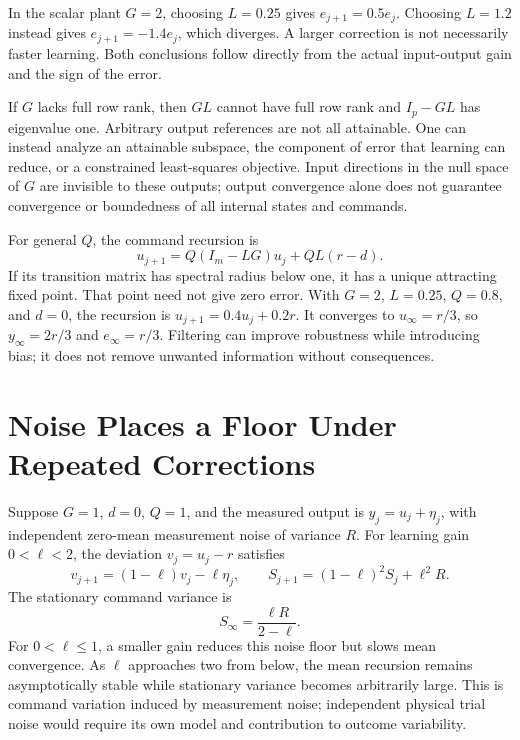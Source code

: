 \documentclass[12pt, openany]{book}
\theoremstyle{plain}
\begin{document}
In the scalar plant $G=2$, choosing $L=0.25$ gives $e_{j+1}=0.5e_j$. Choosing $L=1.2$ instead gives $e_{j+1}=-1.4e_j$, which diverges. A larger correction is not necessarily faster learning. Both conclusions follow directly from the actual input-output gain and the sign of the error.

If $G$ lacks full row rank, then $GL$ cannot have full row rank and $I_p-GL$ has eigenvalue one. Arbitrary output references are not all attainable. One can instead analyze an attainable subspace, the component of error that learning can reduce, or a constrained least-squares objective. Input directions in the null space of $G$ are invisible to these outputs; output convergence alone does not guarantee convergence or boundedness of all internal states and commands.

For general $Q$, the command recursion is
\begin{equation}
u_{j+1}=Q(I_m-LG)u_j+QL(r-d).
\end{equation}
If its transition matrix has spectral radius below one, it has a unique attracting fixed point. That point need not give zero error. With $G=2$, $L=0.25$, $Q=0.8$, and $d=0$, the recursion is $u_{j+1}=0.4u_j+0.2r$. It converges to $u_\infty=r/3$, so $y_\infty=2r/3$ and $e_\infty=r/3$. Filtering can improve robustness while introducing bias; it does not remove unwanted information without consequences.

\section{Noise Places a Floor Under Repeated Corrections}

Suppose $G=1$, $d=0$, $Q=1$, and the measured output is $y_j=u_j+\eta_j$, with independent zero-mean measurement noise of variance $R$. For learning gain $0<\ell<2$, the deviation $v_j=u_j-r$ satisfies
\begin{equation}
v_{j+1}=(1-\ell)v_j-\ell\eta_j,\qquad
S_{j+1}=(1-\ell)^2S_j+\ell^2R .
\end{equation}
The stationary command variance is
\begin{equation}
S_\infty=\frac{\ell R}{2-\ell} .
\end{equation}
For $0<\ell\leq1$, a smaller gain reduces this noise floor but slows mean convergence. As $\ell$ approaches two from below, the mean recursion remains asymptotically stable while stationary variance becomes arbitrarily large. This is command variation induced by measurement noise; independent physical trial noise would require its own model and contribution to outcome variability.
\end{document}
